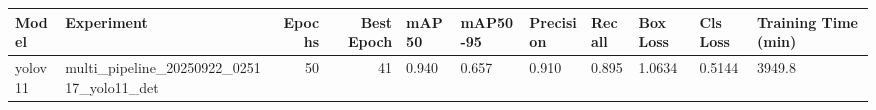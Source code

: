 \begin{tabular}{llrrlllllll}
\toprule
Model & Experiment & Epochs & Best Epoch & mAP50 & mAP50-95 & Precision & Recall & Box Loss & Cls Loss & Training Time (min) \\
\midrule
yolov11 & multi_pipeline_20250922_025117_yolo11_det & 50 & 41 & 0.940 & 0.657 & 0.910 & 0.895 & 1.0634 & 0.5144 & 3949.8 \\
\bottomrule
\end{tabular}
